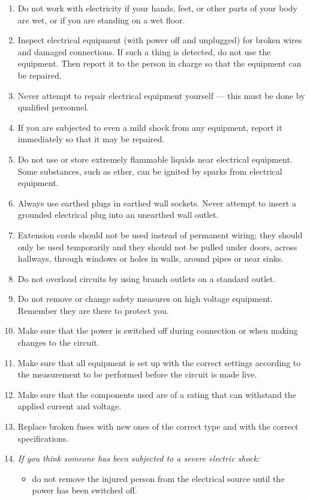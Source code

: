 \documentclass[../Elmag-labhefte-2020.tex]{subfiles}
\begin{document}
\begin{enumerate}
    \item Do not work with electricity if your hands, feet, or other parts of your body are wet, or if you are standing on a wet floor.
    \item Inspect electrical equipment (with power off and unplugged) for broken wires and damaged connections. If such a thing is detected, do not use the equipment. Then report it to the person in charge so that the equipment can be repaired.
    \item Never attempt to repair electrical equipment yourself --- this must be done by qualified personnel.
    \item If you are subjected to even a mild shock from any equipment, report it immediately so that it may be repaired.
    \item Do not use or store extremely flammable liquids near electrical equipment. Some substances, such as ether, can be ignited by sparks from electrical equipment.
    \item Always use earthed plugs in earthed wall sockets. Never attempt to insert a grounded electrical plug into an unearthed wall outlet.
    \item Extension cords should not be used instead of permanent wiring; they should only be used temporarily and they should not be pulled under doors, across hallways, through windows or holes in walls, around pipes or near sinks.
    \item Do not overload circuits by using branch outlets on a standard outlet.
    \item Do not remove or change safety measures on high voltage equipment. Remember they are there to protect you.
    \item Make sure that the power is switched off during connection or when making changes to the circuit.
    \item Make sure that all equipment is set up with the correct settings according to the measurement to be performed before the circuit is made live.
    \item Make sure that the components used are of a rating that can withstand the applied current and voltage.
    \item Replace broken fuses with new ones of the correct type and with the correct specifications.
    \item \emph{If you think someone has been subjected to a severe electric shock:}
    \begin{itemize}
        \item do not remove the injured person from the electrical source until the power has been switched off.

\end{itemize}
\end{enumerate}
\end{document}
